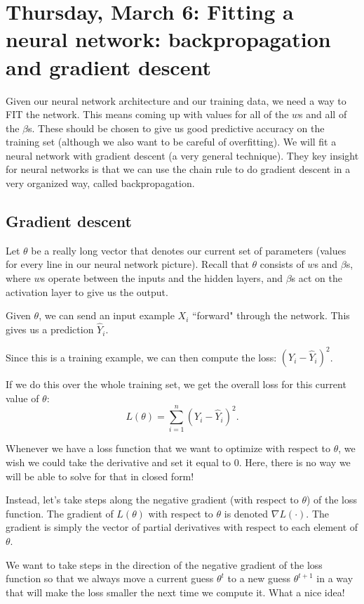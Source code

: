 \section{Thursday, March 6: Fitting a neural network: backpropagation and gradient descent}

Given our neural network architecture and our training data, we need a way to FIT the network. This means coming up with values for all of the $w$s and all of the $\beta$s. These should be chosen to give us good predictive accuracy on the training set (although we also want to be careful of overfitting). We will fit a neural network with gradient descent (a very general technique). They key insight for neural networks is that we can use the chain rule to do gradient descent in a very organized way, called backpropagation. 

\subsection{Gradient descent}

Let $\theta$ be a really long vector that denotes our current set of parameters (values for every line in our neural network picture). Recall that $\theta$ consists of $w$s and $\beta$s, where $w$s operate between the inputs and the hidden layers, and $\beta$s act on the activation layer to give us the output. 

Given $\theta$, we can send an input example $X_i$ ``forward" through the network. This gives us a prediction $\hat{Y}_i$. 

Since this is a training example, we can then compute the loss: $(Y_i - \hat{Y}_i)^2$. 

If we do this over the whole training set, we get the overall loss for this current value of $\theta$:
$$
L(\theta) = \sum_{i=1}^n (Y_i - \hat{Y}_i)^2.
$$

Whenever we have a loss function that we want to optimize with respect to $\theta$, we wish we could take the derivative and set it equal to $0$. Here, there is no way we will be able to solve for that in closed form!

Instead, let's take steps along the negative gradient (with respect to $\theta$) of the loss function. The gradient of $L(\theta)$ with respect to $\theta$ is denoted $\nabla L(\cdot)$. The gradient is simply the vector of partial derivatives with respect to each element of $\theta$.  

We want to take steps in the direction of the negative gradient of the loss function so that we always move a current guess $\theta^t$ to a new guess $\theta^{t+1}$ in a way that will make the loss smaller the next time we compute it. What a nice idea!

